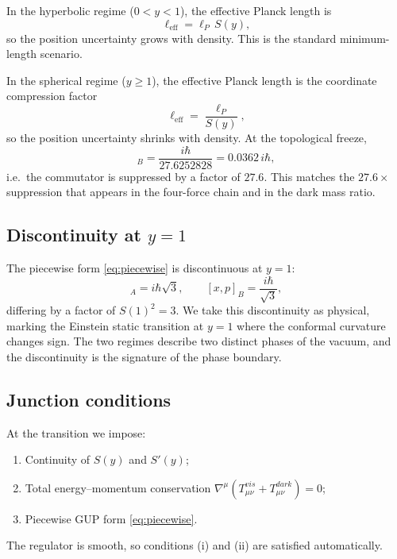 \documentclass[a4paper,7pt,oneside,openany]{book}
\begin{document}
In the hyperbolic regime ($0<y<1$), the effective Planck length 
is
\begin{equation}
\ell_{\text{eff}}=\ell_{P}\,S(y),
\label{eq:l-eff-hyp}
\end{equation}
so the position uncertainty grows with density. This is the 
standard minimum-length scenario.

In the spherical regime ($y\ge 1$), the effective Planck length 
is the coordinate compression factor
\begin{equation}
\ell_{\text{eff}}=\frac{\ell_{P}}{S(y)},
\label{eq:l-eff-sph}
\end{equation}
so the position uncertainty shrinks with density. At the 
topological freeze,
\begin{equation}
[x,p]_{B}=\frac{i\hbar}{27.6252828}=0.0362\,i\hbar,
\label{eq:comm-freeze}
\end{equation}
i.e.\ the commutator is suppressed by a factor of $27.6$. This 
matches the $27.6\times$ suppression that appears in the 
four-force chain and in the dark mass ratio.

\subsection{Discontinuity at \texorpdfstring{$y=1$}{y=1}}

The piecewise form \eqref{eq:piecewise} is discontinuous at 
$y=1$:
\begin{equation}
[x,p]_{A}=i\hbar\sqrt{3},
\qquad
[x,p]_{B}=\frac{i\hbar}{\sqrt{3}},
\label{eq:jump}
\end{equation}
differing by a factor of $S(1)^{2}=3$. We take this 
discontinuity as physical, marking the Einstein static 
transition at $y=1$ where the conformal curvature changes 
sign. The two regimes describe two distinct phases of the 
vacuum, and the discontinuity is the signature of the phase 
boundary.

\subsection{Junction conditions}

At the transition we impose:
\begin{enumerate}
\item Continuity of $S(y)$ and $S'(y)$;
\item Total energy--momentum conservation 
$\nabla^{\mu}(T_{\mu\nu}^{vis}+T_{\mu\nu}^{dark})=0$;
\item Piecewise GUP form \eqref{eq:piecewise}.
\end{enumerate}
The regulator is smooth, so conditions (i) and (ii) are 
satisfied automatically.
\end{document}
